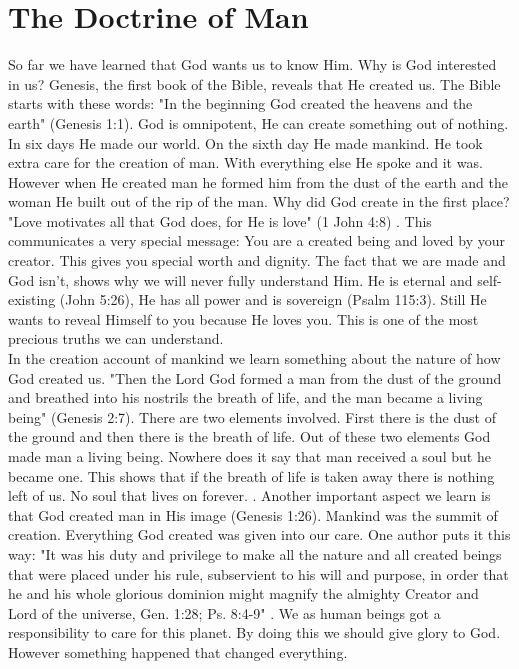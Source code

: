 \section{The Doctrine of Man}
So far we have learned that God wants us to know Him. Why is God interested in us? Genesis, the first book of the Bible, reveals that He created us. The Bible starts with these words: "In the beginning God created the heavens and the earth" (Genesis 1:1). God is omnipotent, He can create something out of nothing. In six days He made our world. On the sixth day He made mankind. He took extra care for the creation of man. With everything else He spoke and it was. However when He created man he formed him from the dust of the earth and the woman He built out of the rip of the man. Why did God create in the first place? "Love motivates all that God does, for He is love" (1 John 4:8) \citep[p. 72]{ministerial1988seventh}. This communicates a very special message: You are a created being and loved by your creator. This gives you special worth and dignity. The fact that we are made and God isn't, shows why we will never fully understand Him. He is eternal and self-existing (John 5:26), He has all power and is sovereign (Psalm 115:3). Still He wants to reveal Himself to you because He loves you. This is one of the most precious truths we can understand.\\
In the creation account of mankind we learn something about the nature of how God created us. "Then the Lord God formed a man from the dust of the ground and breathed into his nostrils the breath of life, and the man became a living being" (Genesis 2:7). There are two elements involved. First there is the dust of the ground and then there is the breath of life. Out of these two elements God made man a living being. Nowhere does it say that man received a soul but he became one. This shows that if the breath of life is taken away there is nothing left of us. No soul that lives on forever. \citep{ministerial1988seventh}.
Another important aspect we learn is that God created man in His image (Genesis 1:26). Mankind was the summit of creation. Everything God created was given into our care. One author puts it this way: "It was his duty and privilege to make all the nature and all created beings that were placed under his rule, subservient to his will and purpose, in order that he and his whole glorious dominion might magnify the almighty Creator and Lord of the universe, Gen. 1:28; Ps. 8:4-9" \citep[p. 183]{berkhof1996systematic}. We as human beings got a responsibility to care for this planet. By doing this we should give glory to God. However something happened that changed everything.

